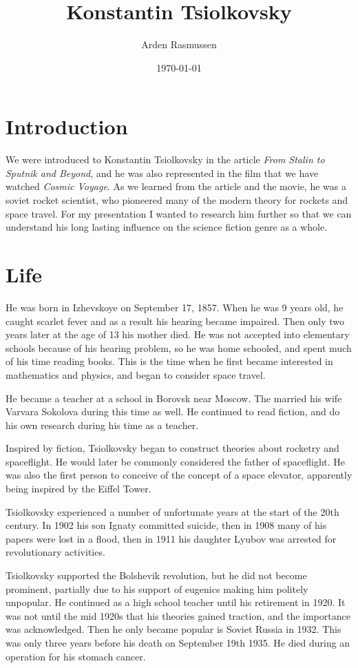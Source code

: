 \documentclass[10pt]{armath}
\title{Konstantin Tsiolkovsky}
\author{Arden Rasmussen}
\date{\today}
\begin{document}
\maketitle

\section{Introduction}%
\label{sec:introduction}

We were introduced to Konstantin Tsiolkovsky in the article \textit{From Stalin
  to Sputnik and Beyond}, and he was also represented in the film that we have
watched \textit{Cosmic Voyage}. As we learned from the article and the movie,
he was a soviet rocket scientist, who pioneered many of the modern theory for
rockets and space travel. For my presentation I wanted to research him further
so that we can understand his long lasting influence on the science fiction
genre as a whole.

\section{Life}%
\label{sec:life}

He was born in Izhevskoye on September 17, 1857. When he was 9 years old, he
caught scarlet fever and as a result his hearing became impaired. Then only two
years later at the age of 13 his mother died. He was not accepted into
elementary schools because of his hearing problem, so he was home schooled, and
spent much of his time reading books. This is the time when he first became
interested in mathematics and physics, and began to consider space travel.

He became a teacher at a school in Borovsk near Moscow. The married his wife
Varvara Sokolova during this time as well. He continued to read fiction, and do
his own research during his time as a teacher.

Inspired by fiction, Tsiolkovsky began to construct theories about rocketry and
spaceflight. He would later be commonly considered the father of spaceflight.
He was also the first person to conceive of the concept of a space elevator,
apparently being inspired by the Eiffel Tower.

Tsiolkovsky experienced a number of unfortunate years at the start of the 20th
century. In 1902 his son Ignaty committed suicide, then in 1908 many of his
papers were lost in a flood, then in 1911 his daughter Lyubov was arrested for
revolutionary activities.

Tsiolkovsky supported the Bolshevik revolution, but he did not become
prominent, partially due to his support of eugenics making him politely
unpopular. He continued as a high school teacher until his retirement in 1920.
It was not until the mid 1920s that his theories gained traction, and the
importance was acknowledged. Then he only became popular is Soviet Russia in
1932. This was only three years before his death on September 19th 1935. He
died during an operation for his stomach cancer.
\end{document}

